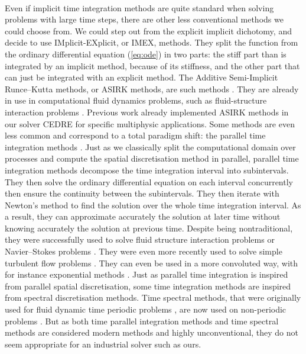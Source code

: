   \paragraph{}
  Even if implicit time integration methods are quite standard when solving problems with large time steps, there are other less conventional methods we could choose from.
  We could step out from the explicit implicit dichotomy, and decide to use IMplicit-EXplicit, or IMEX, methods.
  They split the function from the ordinary differential equation (\ref{eq:ode}) in two parts: the stiff part than is integrated by an implicit method, because of its stiffness, and the other part that can just be integrated with an explicit method.
  The Additive Semi-Implicit Runce--Kutta methods, or ASIRK methods, are such methods \cite{Zhong1996}.
  They are already in use in computational fluid dynamics problems, such as fluid-structure interaction problems \cite{HuangPerssonZahr2019}.
  Previous work already implemented ASIRK methods in our solver CEDRE for specific multiphysic applications.
  Some methods are even less common and correspond to a total paradigm shift: the parallel time integration methods \cite{Nievergelt1964, LionsMadayTurinici2001}.
  Just as we classically split the computational domain over processes and compute the spatial discretisation method in parallel, parallel time integration methods decompose the time integration interval into subintervals.
  They then solve the ordinary differential equation on each interval concurrently then ensure the continuity between the subintervals.
  They then iterate with Newton's method to find the solution over the whole time integration interval.
  As a result, they can approximate accurately the solution at later time without knowing accurately the solution at previous time.
  Despite being nontraditional, they were successfully used to solve fluid structure interaction problems or Navier--Stokes problems \cite{GanderVandewalle2007}.
  They were even more recently used to solve simple turbulent flow problems \cite{Lunet2018}.
  They can even be used in a more convoluted way, with for instance exponential methods \cite{GanderGuettel2013}.
  Just as parallel time integration is inspired from parallel spatial discretisation, some time integration methods are inspired from spectral discretisation methods.
  Time spectral methods, that were originally used for fluid dynamic time periodic problems \cite{GopinathJameson2005, GopinathJameson2006}, are now used on non-periodic problems \cite{EkiciDjeddiLiEtAl2020}.
  But as both time parallel integration methods and time spectral methods are considered modern methods and highly unconventional, they do not seem appropriate for an industrial solver such as ours.


